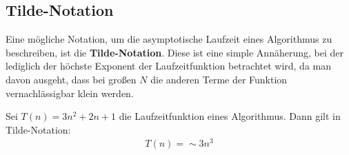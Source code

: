 \documentclass[11pt]{article}
\begin{document}
\subsection{Tilde-Notation}
Eine mögliche Notation, um die asymptotische Laufzeit eines Algorithmus zu beschreiben, ist die \textbf{Tilde-Notation}.
Diese ist eine simple Annäherung, bei der lediglich der höchste Exponent der Laufzeitfunktion betrachtet wird, da man davon
ausgeht, dass bei großen $N$ die anderen Terme der Funktion vernachlässigbar klein werden.

\begin{bsp}
  Sei $T(n) = 3n^2 + 2n + 1$ die Laufzeitfunktion eines Algorithmus. Dann gilt in Tilde-Notation:
  \begin{align*}
    T(n) = \sim 3n^3
  \end{align*}
\end{bsp}

\subsection{}
\end{document}
